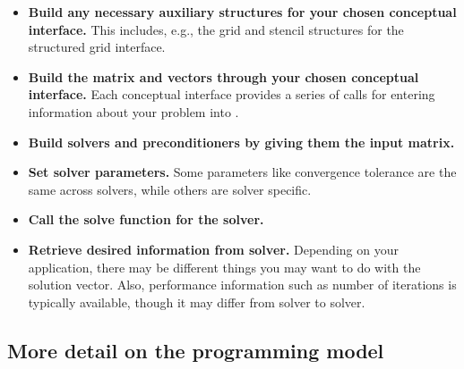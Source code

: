 \begin{itemize}

\item
{\bf Build any necessary auxiliary structures for your chosen conceptual
interface.} This includes, e.g., 
the grid and stencil structures for the structured grid interface.

\item
{\bf Build the matrix and vectors through your chosen conceptual interface.} Each
conceptual interface 
provides a series of calls for entering information about your problem into
\hypre{}.

\item
{\bf Build solvers and preconditioners by giving them the input matrix.}

\item
{\bf Set solver parameters.} Some parameters like convergence tolerance are the
same across solvers, 
while others are solver specific.

\item
{\bf Call the solve function for the solver.}

\item
{\bf Retrieve desired information from solver.} Depending on your application,
there may be different 
things you may want to do with the solution vector. Also, performance
information such as number of 
iterations is typically available, though it may differ from solver to solver.

\end{itemize}


\subsection{More detail on the programming model}

